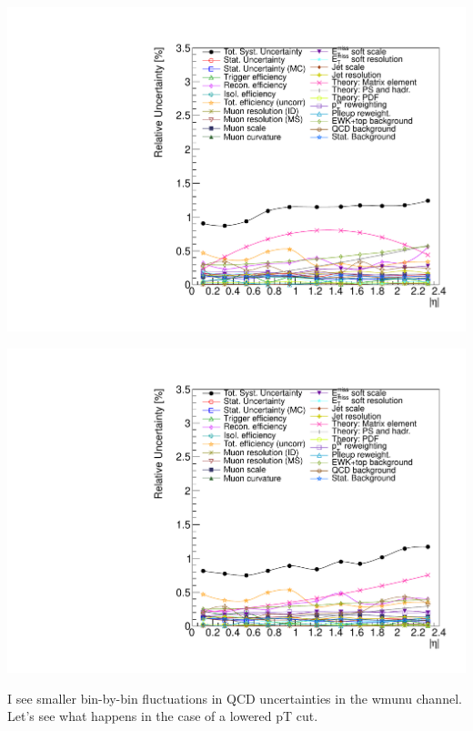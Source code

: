 {
\colb[T]
\centering
{}
\includegraphics[width=1.0\textwidth]{dates/20130602/figures/v26.allqcd/Wmn_SYSTEM_1D_PT25_NEG_Unc_proj}

\centering
{}
\includegraphics[width=1.0\textwidth]{dates/20130602/figures/v26.allqcd/Wmn_SYSTEM_1D_PT25_POS_Unc_proj}
\cole
}

{
I see smaller bin-by-bin fluctuations in QCD uncertainties in the wmunu channel. \\
Let's see what happens in the case of a lowered pT cut.
}

